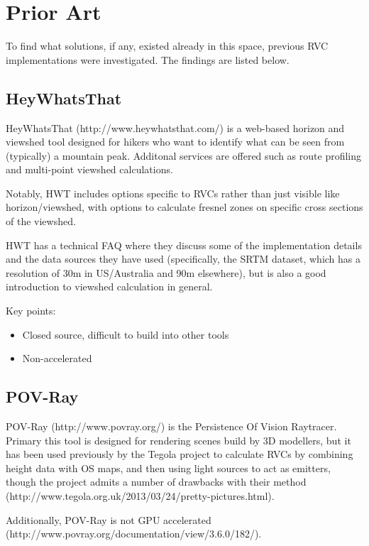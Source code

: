 \documentclass[a4paper]{article}
\begin{document}
    \section{Prior Art}
    To find what solutions, if any, existed already in this space, previous RVC implementations were investigated.
    The findings are listed below.

        \subsection{HeyWhatsThat}
        HeyWhatsThat (http://www.heywhatsthat.com/) is a web-based horizon and viewshed tool designed for hikers who
        want to identify what can be seen from (typically) a mountain peak. Additonal services are offered such as
        route profiling and multi-point viewshed calculations.

        Notably, HWT includes options specific to RVCs rather than just visible like horizon/viewshed, with options to
        calculate fresnel zones on specific cross sections of the viewshed.

        HWT has a technical FAQ where they discuss some of the implementation details and the data sources they have
        used (specifically, the SRTM dataset, which has a resolution of 30m in US/Australia and 90m elsewhere), but is
        also a good introduction to viewshed calculation in general.

        Key points:
        \begin{itemize}
            \item Closed source, difficult to build into other tools
            \item Non-accelerated
        \end{itemize}

        \subsection{POV-Ray}
        POV-Ray (http://www.povray.org/) is the Persistence Of Vision Raytracer. Primary this tool is designed for
        rendering scenes build by 3D modellers, but it has been used previously by the Tegola project to calculate
        RVCs by combining height data with OS maps, and then using light sources to act as emitters, though the project
        admits a number of drawbacks with their method (http://www.tegola.org.uk/2013/03/24/pretty-pictures.html).

        Additionally, POV-Ray is not GPU accelerated (http://www.povray.org/documentation/view/3.6.0/182/).
\end{document}
